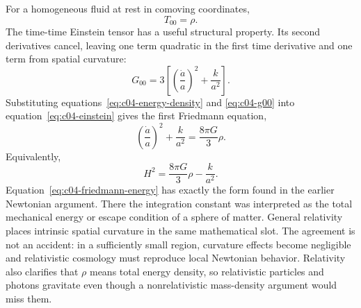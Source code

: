 For a homogeneous fluid at rest in comoving coordinates,
\begin{equation}
T_{00}=\rho.
\label{eq:c04-energy-density}
\end{equation}
The time-time Einstein tensor has a useful structural property. Its second derivatives cancel, leaving one term quadratic in the first time derivative and one term from spatial curvature:
\begin{equation}
G_{00}=3\left[
\left(\frac{\dot a}{a}\right)^2+\frac{k}{a^2}
\right].
\label{eq:c04-g00}
\end{equation}
Substituting equations~\eqref{eq:c04-energy-density} and \eqref{eq:c04-g00} into equation~\eqref{eq:c04-einstein} gives the first Friedmann equation,
\begin{equation}
\boxed{
\left(\frac{\dot a}{a}\right)^2+\frac{k}{a^2}
=\frac{8\pi G}{3}\rho
}.
\label{eq:c04-friedmann}
\end{equation}
Equivalently,
\begin{equation}
H^2=\frac{8\pi G}{3}\rho-\frac{k}{a^2}.
\label{eq:c04-friedmann-energy}
\end{equation}
Equation~\eqref{eq:c04-friedmann-energy} has exactly the form found in the earlier Newtonian argument. There the integration constant was interpreted as the total mechanical energy or escape condition of a sphere of matter. General relativity places intrinsic spatial curvature in the same mathematical slot. The agreement is not an accident: in a sufficiently small region, curvature effects become negligible and relativistic cosmology must reproduce local Newtonian behavior. Relativity also clarifies that \(\rho\) means total energy density, so relativistic particles and photons gravitate even though a nonrelativistic mass-density argument would miss them.

\begin{classroomqa}
\end{classroomqa}

